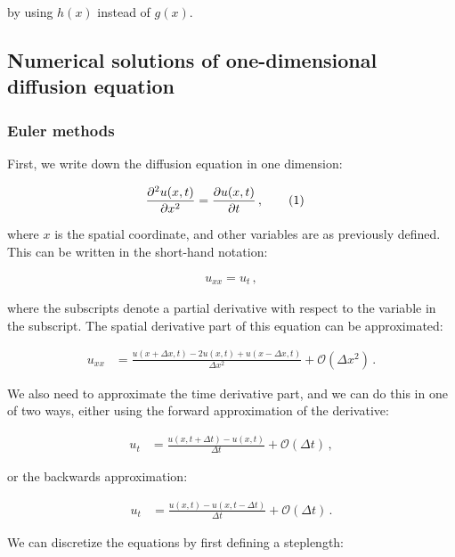 \documentclass[reprint,english,notitlepage]{revtex4-1}  %
\newcommand\numberthis{\addtocounter{equation}{1}\tag{\theequation}}
\begin{document}
by using $h(x)$ instead of $g(x)$. 


\subsection{Numerical solutions of one-dimensional diffusion equation} \label{sec:formalism_numerical_1D}

\subsubsection{Euler methods} \label{sec:formalism_euler_methods}

First, we write down the diffusion equation in one dimension:

\begin{align*}
\frac{\partial^2 u(x,t)}{\partial x ^2} &= \frac{\partial u(x,t)}{\partial t} \, , \numberthis \label{eq:1D_diff_eq}
\end{align*}

where $x$ is the spatial coordinate, and other variables are as previously defined. This can be written in the short-hand notation:

\begin{align*}
u_{xx} = u_t \, ,
\end{align*}

where the subscripts denote a partial derivative with respect to the variable in the subscript. The spatial derivative part of this equation can be approximated:

\begin{align*}
u_{xx} &= \frac{u(x + \Delta x,t) - 2u(x,t) + u(x-\Delta x,t)}{\Delta x^2} + \mathcal{O}(\Delta x^2) \, .
\end{align*}

We also need to approximate the time derivative part, and we can do this in one of two ways, either using the forward approximation of the derivative:

\begin{align*}
u_t &= \frac{u(x,t+\Delta t) - u(x,t)}{\Delta t} + \mathcal{O}(\Delta t) \, ,
\end{align*}

or the backwards approximation:

\begin{align*}
u_t &= \frac{u(x,t) - u(x,t-\Delta t)}{\Delta t} + \mathcal{O}(\Delta t) \, .
\end{align*}

We can discretize the equations by first defining a steplength:
\end{document}

